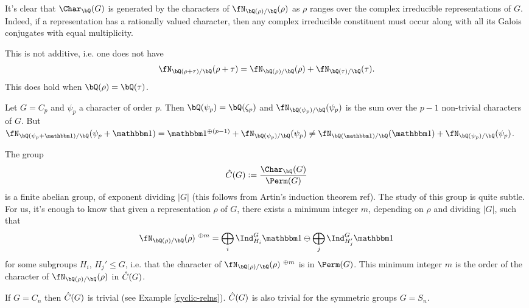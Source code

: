 It's clear that $\Char_{\bQ}(G)$ is generated by the characters of $\repnorm{\rho}$ as $\rho$ ranges over the complex irreducible representations of $G$. Indeed, if a representation has a rationally valued character, then any complex irreducible constituent must occur along with all its Galois conjugates with equal multiplicity.

\begin{rem}
This is not additive, i.e. one does not have \[\repnorm{\rho + \tau} = \repnorm{\rho} + \repnorm{\tau}. \] 
This does hold when $\bQ(\rho) = \bQ(\tau)$. 
\end{rem}

\begin{example}
    Let $G = C_p$ and $\psi_p$ a character of order $p$. Then $\bQ(\psi_p) = \bQ(\zeta_p)$ and $\repnorm{\psi_p}$ is the sum over the $p - 1$ non-trivial characters of $G$. But $\repnorm{\psi_p + \trivial} = \trivial^{\oplus (p - 1)} + \repnorm{\psi_p} \not= \repnorm{\trivial} + \repnorm{\psi_p}$.
\end{example}



\begin{rem}\label{image-of-burnside}
The group $$\C(G) \defeq \frac{\Char_{\bQ}(G)}{\Perm(G)}$$ is a finite abelian group, of exponent dividing $|G|$ (this follows from Artin's induction theorem {\color{red} ref}). The study of this group is quite subtle. For us, it's enough to know that given a representation $\rho$ of $G$, there exists a minimum integer $m$, depending on $\rho$ and dividing $|G|$, such that 
\[ \repnorm{\rho}^{\ \oplus m } = \bigoplus_i \Ind_{H_i}^G \trivial \ominus \bigoplus_j \Ind_{H_j'}^{G} \trivial \]
for some subgroups $H_i$, $H_j' \leq G$, i.e. that the character of $\repnorm{\rho}^{\ \oplus m }$ is in $\Perm(G)$. This minimum integer $m$ is the order of the character of $\repnorm{\rho}$ in $\hat{C}(G)$. 
\end{rem}
\begin{example}
If $G = C_n$ then $\hat{C}(G)$ is trivial (see Example \ref{cyclic-relns}). $\hat{C}(G)$ is also trivial for the symmetric groups $G = S_n$. 
\end{example}

